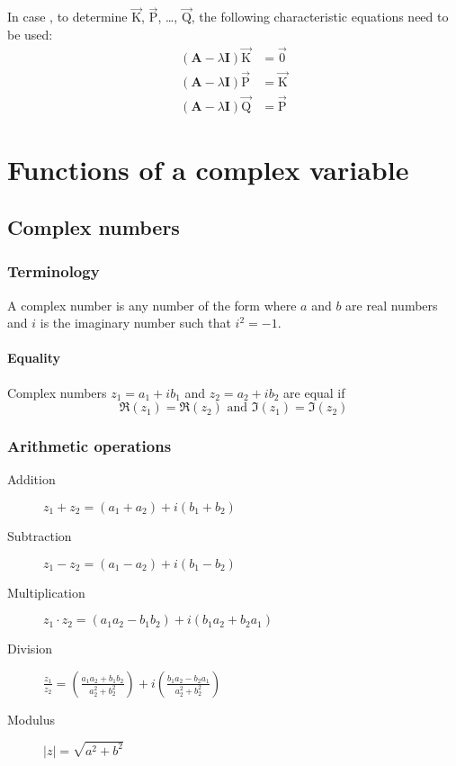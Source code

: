 \documentclass[10pt, twocolumn]{article}
\theoremstyle{definition}
\begin{document}
In case , to determine \(\vec{\mathrm{K}}\), \(\vec{\mathrm{P}}\), \dots, \(\vec{\mathrm{Q}}\), the following characteristic equations need to be used:
\begin{align*}
  (\mathbf{A} - \lambda\mathbf{I})\vec{\mathrm{K}} & = \vec{0}          \\
  (\mathbf{A} - \lambda\mathbf{I})\vec{\mathrm{P}} & = \vec{\mathrm{K}} \\
  (\mathbf{A} - \lambda\mathbf{I})\vec{\mathrm{Q}} & = \vec{\mathrm{P}}
\end{align*}


\section{Functions of a complex variable}
\subsection{Complex numbers}
\subsubsection*{Terminology}
A complex number is any number of the form  where \(a\) and \(b\) are real numbers and \(i\) is the imaginary number such that \(i^2 = -1\).

\paragraph*{Equality}
Complex numbers \(z_1 = a_1 + ib_1 \) and \(z_2 = a_2 + ib_2 \) are equal if
\[
  \Re(z_1 ) = \Re(z_2 ) \text{ and } \Im(z_1 ) = \Im(z_2 )
\]
\subsubsection*{Arithmetic operations}
\begin{description}
  \item[Addition] \(z_1 + z_2 = (a_1 + a_2 ) + i(b_1 + b_2 )\)
  \item[Subtraction] \(z_1 - z_2 = (a_1 - a_2 ) + i(b_1 - b_2 )\)
  \item[Multiplication] \(z_1 \cdot z_2 = (a_1 a_2 - b_1 b_2 ) + i(b_1 a_2 + b_2 a_1 )\)
  \item[Division] \(\frac{z_1 }{z_2 } = \left( \frac{a_1 a_2 + b_1 b_2 }{a_2 ^2 + b_2 ^2 } \right) + i\left( \frac{b_1 a_2 - b_2 a_1 }{a_2 ^2 + b_2 ^2 } \right)\)
  \item[Modulus] \(| z | = \sqrt{a^2 + b^2 }\)
\end{description}
\end{document}
